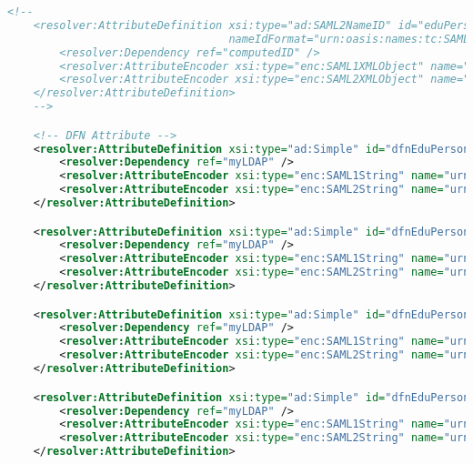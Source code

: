 \begin{lstlisting}[language=xml]
    <!--
    <resolver:AttributeDefinition xsi:type="ad:SAML2NameID" id="eduPersonTargetedID"
                                  nameIdFormat="urn:oasis:names:tc:SAML:2.0:nameid-format:persistent" sourceAttributeID="computedID">
        <resolver:Dependency ref="computedID" />
        <resolver:AttributeEncoder xsi:type="enc:SAML1XMLObject" name="urn:oid:1.3.6.1.4.1.5923.1.1.1.10" />
        <resolver:AttributeEncoder xsi:type="enc:SAML2XMLObject" name="urn:oid:1.3.6.1.4.1.5923.1.1.1.10" friendlyName="eduPersonTargetedID" />
    </resolver:AttributeDefinition>
    -->

    <!-- DFN Attribute -->
    <resolver:AttributeDefinition xsi:type="ad:Simple" id="dfnEduPersonCostCenter" sourceAttributeID="dfnEduPersonCostCenter">
        <resolver:Dependency ref="myLDAP" />
        <resolver:AttributeEncoder xsi:type="enc:SAML1String" name="urn:mace:dir:attribute-def:dfnEduPersonCostCenter" />
        <resolver:AttributeEncoder xsi:type="enc:SAML2String" name="urn:oid:1.3.6.1.4.1.22177.400.1.1.3.1" friendlyName="dfnEduPersonCostCenter" />
    </resolver:AttributeDefinition>

    <resolver:AttributeDefinition xsi:type="ad:Simple" id="dfnEduPersonStudyBranch1" sourceAttributeID="dfnEduPersonStudyBranch1">
        <resolver:Dependency ref="myLDAP" />
        <resolver:AttributeEncoder xsi:type="enc:SAML1String" name="urn:mace:dir:attribute-def:dfnEduPersonStudyBranch1" />
        <resolver:AttributeEncoder xsi:type="enc:SAML2String" name="urn:oid:1.3.6.1.4.1.22177.400.1.1.3.2" friendlyName="dfnEduPersonStudyBranch1" />
    </resolver:AttributeDefinition>

    <resolver:AttributeDefinition xsi:type="ad:Simple" id="dfnEduPersonStudyBranch2" sourceAttributeID="dfnEduPersonStudyBranch2">
        <resolver:Dependency ref="myLDAP" />
        <resolver:AttributeEncoder xsi:type="enc:SAML1String" name="urn:mace:dir:attribute-def:dfnEduPersonStudyBranch2" />
        <resolver:AttributeEncoder xsi:type="enc:SAML2String" name="urn:oid:1.3.6.1.4.1.22177.400.1.1.3.3" friendlyName="dfnEduPersonStudyBranch2" />
    </resolver:AttributeDefinition>

    <resolver:AttributeDefinition xsi:type="ad:Simple" id="dfnEduPersonStudyBranch3" sourceAttributeID="dfnEduPersonStudyBranch3">
        <resolver:Dependency ref="myLDAP" />
        <resolver:AttributeEncoder xsi:type="enc:SAML1String" name="urn:mace:dir:attribute-def:dfnEduPersonStudyBranch2" />
        <resolver:AttributeEncoder xsi:type="enc:SAML2String" name="urn:oid:1.3.6.1.4.1.22177.400.1.1.3.4" friendlyName="dfnEduPersonStudyBranch3" />
    </resolver:AttributeDefinition>


\end{lstlisting}
